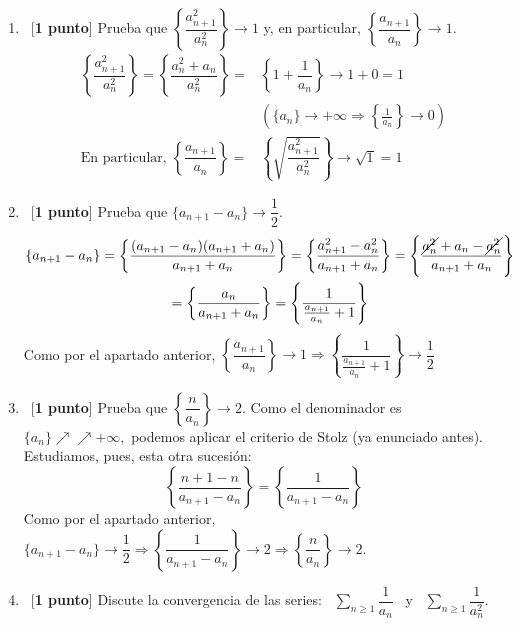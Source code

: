\documentclass[12pt]{article}
\begin{document}
\begin{ejercicio}
\begin{enumerate}[label=\alph*)]
            \item\ [\textbf{1 punto}] Prueba que $\left\{\dfrac{a^2_{n+1}}{a^2_n}\right\} \xrightarrow{} 1$ y, en particular, $\left\{\dfrac{a_{n+1}}{a_n}\right\} \xrightarrow{} 1$.
            \begin{align*}
                 \left\{\dfrac{a_{n+1}^2}{a_n^2}\right\} = \left\{\dfrac{a_n^2 + a_n}{a_n^2}\right\}  = &\left\{ 1 + \dfrac{1}{a_n} \right\} 
                 \longrightarrow 1 + 0 = 1  \\
                & \left(\{a_n\} \rightarrow +\infty \Rightarrow \left\{\frac{1}{a_n}\right\} \rightarrow 0\right)\\
                 \text{En particular, } \left\{ \dfrac{a_{n+1}}{a_n}\right\}  = & \left\{\sqrt{ \dfrac{a_{n+1}^2}{a_n^2}}\right\} \rightarrow \sqrt{1} = 1
            \end{align*}
            \item\ [\textbf{1 punto}] Prueba que $\{a_{n+1} - a_n\} \rightarrow
            \dfrac{1}{2}$.
            \begin{gather*}
                \{a_{n+1} - a_n\} = \left\{\dfrac{(a_{n+1} - a_n)(a_{n+1} + a_n)}{a_{n+1} + a_n}\right\} = \left\{\dfrac{a_{n+1}^2 - a_n^2} {a_{n+1} + a_n}\right\} = \left\{\dfrac{\cancel{a_n^2} + a_n- \cancel{a_n^2}} {a_{n+1} + a_n}\right\} \\ = \left\{\frac{a_n}{a_{n+1} + a_n}\right\} = \left\{\frac{1}{\frac{a_{n+1}}{a_n} + 1}\right\}
            \end{gather*}
            Como  por el apartado anterior, $\left\{\dfrac{a_{n+1}}{a_n}\right\} \rightarrow 1 \Rightarrow\left\{\dfrac{1}{\frac{a_{n+1}}{a_n} + 1}\right\} \rightarrow \dfrac{1}{2}$
            \item\ [\textbf{1 punto}] Prueba que $\left\{\dfrac{n}{a_n}\right\} \xrightarrow{} 2$.
            Como el denominador es $\{a_n\} \nearrow \nearrow +\infty,$ podemos aplicar el criterio de Stolz (ya enunciado antes).
            Estudiamos, pues, esta otra sucesión:
            \begin{equation*}
                \left\{\dfrac{n + 1 - n}{a_{n+1} - a_n}\right\} = \left\{\dfrac{1}{a_{n+1} - a_n}\right\}
            \end{equation*}
            Como por el apartado anterior, $\{a_{n+1} - a_n\} \rightarrow \dfrac{1}{2} \Rightarrow \left\{\dfrac{1}{a_{n+1} - a_n}\right\} \rightarrow 2 \Rightarrow \left\{\dfrac{n}{a_n}\right\} \rightarrow 2.$
            \item\ [\textbf{1 punto}] Discute la convergencia de las series: \ $\displaystyle \sum\limits_{n\geq 1} \dfrac{1}{a_n}$ \ y \ $\displaystyle \sum\limits_{n\geq1} \dfrac{1}{a^2_n}$. \\

\end{enumerate}
\end{ejercicio}
\end{document}
